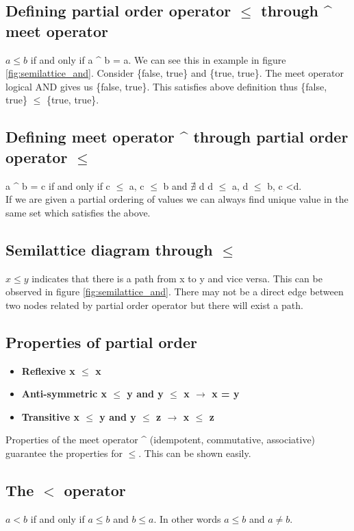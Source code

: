 \subsection{Defining partial order operator $\leq$ through \^{} meet operator}
$a\leq b$ if and only if a \^{} b = a. We can see this in example in figure \ref{fig:semilattice_and}. Consider \{false, true\} and \{true, true\}. The meet operator logical AND gives us \{false, true\}. This satisfies above definition thus \{false, true\} $\leq$ \{true, true\}. 

\subsection{Defining meet operator \^{} through partial order operator $\leq$}
a \^{} b = c if and only if c $\leq$ a, c $\leq$ b and $\nexists$ d d $\leq$ a, d $\leq$ b, c \textless  d. \\
If we are given a partial ordering of values we can always find unique value in the same set which satisfies the above.

\subsection{Semilattice diagram through  $\leq$}
$x\leq y$ indicates that there is a path from x to y and vice versa. This can be observed in figure \ref{fig:semilattice_and}. There may not be a direct edge between two nodes related by partial order operator but there will exist a path.

\subsection{Properties of partial order}
\begin{itemize}
    \item \textbf{Reflexive x $\leq$ x}
    \item \textbf{Anti-symmetric x $\leq$ y and y $\leq$ x $\rightarrow$ x = y}
    \item \textbf{Transitive x $\leq$ y and y $\leq$ z $\rightarrow$ x $\leq$ z}
\end{itemize}
Properties of the meet operator \^{} (idempotent, commutative, associative) guarantee the properties for $\leq$. This can be shown easily.

\subsection{The $<$ operator}
$a<b$ if and only if $a \leq b$ and $b \leq a$. In other words $a\leq b$ and $a\neq b$.

